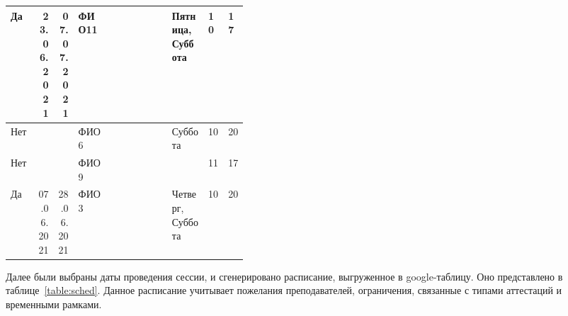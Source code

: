\begin{table}[htbp]
\begin{tabular}{|p{0.05\linewidth}|p{0.02\linewidth}|p{0.02\linewidth}|p{0.07\linewidth}|p{0.07\linewidth}|p{0.02\linewidth}|p{0.02\linewidth}|p{0.08\linewidth}|p{0.02\linewidth}|p{0.02\linewidth}|}
		Да           & \multicolumn{1}{r|}{23.06.2021} & \multicolumn{1}{r|}{07.07.2021} & ФИО11 &                           &                                 &                                 & Пятница, Суббота & 10                        & 17                        \\ \hline
		Нет          &                                 &                                 & ФИО6  &                           &                                 &                                 & Суббота                       & 10                        & 20                        \\ \hline
		Нет          &                                 &                                 & ФИО9  &                           &                                 &                                 &                               & 11                        & 17                        \\ \hline
		Да           & \multicolumn{1}{r|}{07.06.2021} & \multicolumn{1}{r|}{28.06.2021} & ФИО3  &                           &                                 &                                 & Четверг, Суббота              & 10                        & 20                        \\ \hline
	\end{tabular} 	\label{table:wishes}
\end{table} 
\FloatBarrier

Далее были выбраны даты проведения сессии, и сгенерировано расписание, выгруженное в google-таблицу. Оно представлено в таблице~\ref{table:sched}. Данное расписание учитывает пожелания преподавателей, ограничения, связанные с типами аттестаций и временными рамками.

